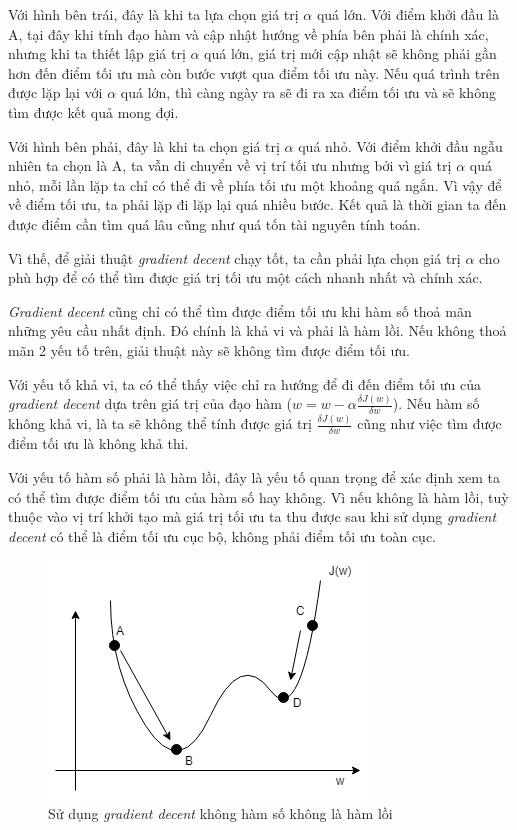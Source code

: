 Với hình bên trái, đây là khi ta lựa chọn giá trị $\alpha$ quá lớn. Với điểm khởi đầu là A, tại đây khi tính đạo hàm và cập nhật hướng về phía bên phải là chính xác, nhưng khi ta thiết lập giá trị $\alpha$ quá lớn, giá trị mới cập nhật sẽ không phải gần hơn đến điểm tối ưu mà còn bước vượt qua điểm tối ưu này. Nếu quá trình trên được lặp lại với $\alpha$ quá lớn, thì càng ngày ra sẽ đi ra xa điểm tối ưu và sẽ không tìm được kết quả mong đợi.

Với hình bên phải, đây là khi ta chọn giá trị $\alpha$ quá nhỏ. Với điểm khởi đầu ngẫu nhiên ta chọn là A, ta vẫn di chuyển về vị trí tối ưu nhưng bởi vì giá trị $\alpha$ quá nhỏ, mỗi lần lặp ta chỉ có thể đi về phía tối ưu một khoảng quá ngắn. Vì vậy để về điểm tối ưu, ta phải lặp đi lặp lại quá nhiều bước. Kết quả là thời gian ta đến được điểm cần tìm quá lâu cũng như quá tốn tài nguyên tính toán.

Vì thế, để giải thuật \textit{gradient decent} chạy tốt, ta cần phải lựa chọn giá trị $\alpha$ cho phù hợp để có thể tìm được giá trị tối ưu một cách nhanh nhất và chính xác.

\textit{Gradient decent} cũng chỉ có thể tìm được điểm tối ưu khi hàm số thoả mãn những yêu cầu nhất định. Đó chính là khả vi và phải là hàm lồi. Nếu không thoả mãn 2 yếu tố trên, giải thuật này sẽ không tìm được điểm tối ưu.

Với yếu tố khả vi, ta có thể thấy việc chỉ ra hướng để đi đến điểm tối ưu của \textit{gradient decent} dựa trên giá trị của đạo hàm ($w = w - \alpha\frac{\delta J(w)}{\delta w}$). Nếu hàm số không khả vi, là ta sẽ không thể tính được giá trị $\frac{\delta J(w)}{\delta w}$ cũng như việc tìm được điểm tối ưu là không khả thi.

Với yếu tố hàm số phải là hàm lồi, đây là yếu tố quan trọng để xác định xem ta có thể tìm được điểm tối ưu của hàm số hay không. Vì nếu không là hàm lồi, tuỳ thuộc vào vị trí khởi tạo mà giá trị tối ưu ta thu được sau khi sử dụng \textit{gradient decent} có thể là điểm tối ưu cục bộ, không phải điểm tối ưu toàn cục.

\begin{figure}[!h]
\centerline{\includegraphics{books/artificial-neural-network/chapter02/figure/grad_5.png}}
\caption{Sử dụng \textit{
gradient decent} không hàm số không là hàm lồi}
\label{fig:grad_5}
\end{figure}

